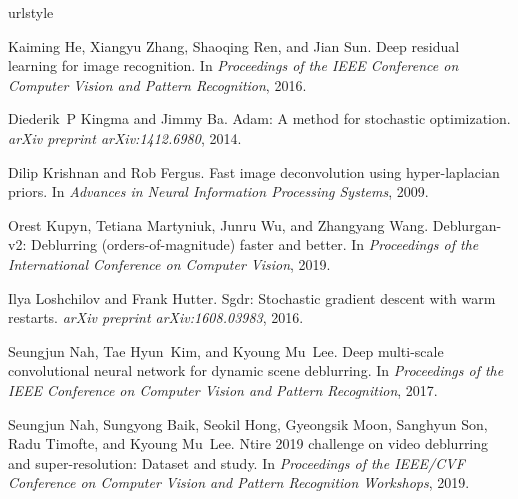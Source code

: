 \documentclass[final]{cvpr}
\begin{document}
{\small
%
\setlength{\bibsep}{0pt}
\begin{thebibliography}{12}
\providecommand{\natexlab}[1]{#1}
\providecommand{\url}[1]{\texttt{#1}}
\expandafter\ifx\csname urlstyle\endcsname\relax
  \providecommand{\doi}[1]{doi: #1}\else
  \providecommand{\doi}{doi: \begingroup \urlstyle{rm}\Url}\fi

Kaiming He, Xiangyu Zhang, Shaoqing Ren, and Jian Sun.
\newblock Deep residual learning for image recognition.
\newblock In \emph{Proceedings of the {IEEE} Conference on Computer Vision and
  Pattern Recognition}, 2016.

Diederik~P Kingma and Jimmy Ba.
\newblock Adam: A method for stochastic optimization.
\newblock \emph{arXiv preprint arXiv:1412.6980}, 2014.

Dilip Krishnan and Rob Fergus.
\newblock Fast image deconvolution using hyper-laplacian priors.
\newblock In \emph{Advances in Neural Information Processing Systems}, 2009.

Orest Kupyn, Tetiana Martyniuk, Junru Wu, and Zhangyang Wang.
\newblock Deblurgan-v2: Deblurring (orders-of-magnitude) faster and better.
\newblock In \emph{Proceedings of the International Conference on Computer
  Vision}, 2019.

Ilya Loshchilov and Frank Hutter.
\newblock Sgdr: Stochastic gradient descent with warm restarts.
\newblock \emph{arXiv preprint arXiv:1608.03983}, 2016.

Seungjun Nah, Tae Hyun~Kim, and Kyoung Mu~Lee.
\newblock Deep multi-scale convolutional neural network for dynamic scene
  deblurring.
\newblock In \emph{Proceedings of the {IEEE} Conference on Computer Vision and
  Pattern Recognition}, 2017.

Seungjun Nah, Sungyong Baik, Seokil Hong, Gyeongsik Moon, Sanghyun Son, Radu
  Timofte, and Kyoung Mu~Lee.
\newblock Ntire 2019 challenge on video deblurring and super-resolution:
  Dataset and study.
\newblock In \emph{Proceedings of the IEEE/CVF Conference on Computer Vision
  and Pattern Recognition Workshops}, 2019.


\end{thebibliography}}
\end{document}
